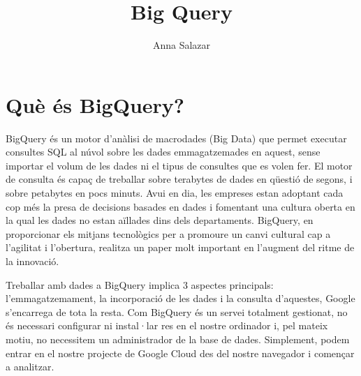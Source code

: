 \documentclass[12pt,longbibliography]{article}
\title{Big Query}
\author{Anna Salazar}
\theoremstyle{definition}
\theoremstyle{remark}
\begin{document}
\begin{titlepage}
\maketitle

\vspace{140mm}

\par
{}%
\hfill
{}%
\par

\end{titlepage}

\tableofcontents

\pagebreak


\section{Què és BigQuery?}

BigQuery és un motor d’anàlisi de macrodades (Big Data) que permet executar consultes SQL al núvol sobre les dades emmagatzemades en aquest, sense importar el volum de les dades ni el tipus de consultes que es volen fer. El motor de consulta és capaç de treballar sobre terabytes de dades en qüestió de segons, i sobre petabytes en pocs minuts. Avui en dia, les empreses estan adoptant cada cop més la presa de decisions basades en dades i fomentant una cultura oberta en la qual les dades no estan aïllades dins dels departaments. BigQuery, en proporcionar els mitjans tecnològics per a promoure un canvi cultural cap a l’agilitat i l’obertura, realitza un paper molt important en l’augment del ritme de la innovació.

\vspace{2mm}

Treballar amb dades a BigQuery implica 3 aspectes principals: l’emmagatzemament, la incorporació de les dades i la consulta d’aquestes, Google s’encarrega de tota la resta. Com BigQuery és un servei totalment gestionat, no és necessari configurar ni instal·lar res en el nostre ordinador i, pel mateix motiu, no necessitem un administrador de la base de dades. Simplement, podem entrar en el nostre projecte de Google Cloud des del nostre navegador i començar a analitzar.
\end{document}

